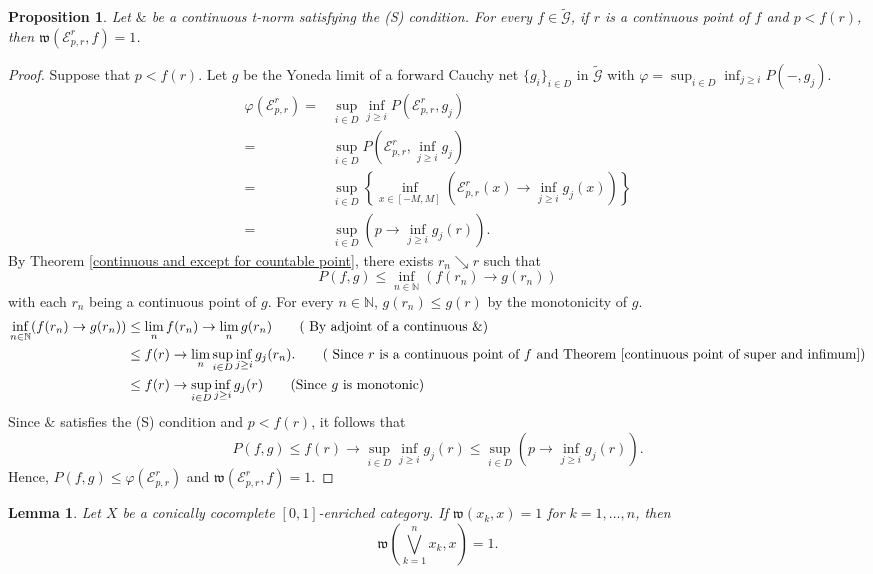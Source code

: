 \documentclass[preprint,3p,times]{elsarticle}
\theoremstyle{plain}
\newtheorem{lem}[thm]{Lemma}
\newtheorem{prop}[thm]{Proposition}
\theoremstyle{definition}
\renewcommand{\phi}{\varphi}
\numberwithin{equation}{section}
\begin{document}
\begin{prop} \label{right branch way below}
	Let \( \& \) be a continuous t-norm satisfying the (S) condition.  For every \(f\in \tilde{\mathcal{G}}\), if \(r\) is a continuous point of \(f\) and \(p < f(r)\), 
	then \( \mathfrak{w}(\mathcal{E}^r_{p,r},f)=1\).  
\end{prop}
\begin{proof}

    Suppose that \(p< f(r) \).
	Let \(g\) be the Yoneda limit of a forward Cauchy net \(\{g_i\}_{i \in D}\) in \(\tilde{\mathcal{G}}\) with \(\phi=\sup_{i\in D} \inf_{j\ge i} P(-,g_j )\).
    \begin{align*}
		\phi (\mathcal{E}^r_{p,r})=& \sup_{i\in D} \inf_{j\ge i} P(\mathcal{E}^r_{p,r},g_j )\\
		=&\sup_{i\in D}P(\mathcal{E}^r_{p,r}, \inf_{j\ge i}g_j )\\
		=&\sup_{i\in D}\left\{\inf_{x\in [-M,M]} (\mathcal{E}^r_{p,r}(x)\rightarrow \inf_{j\ge i}g_j (x))\right\}\\
		=&\sup_{i\in D}( p\rightarrow \inf_{j\ge i}g_j (r)).
	\end{align*}
	By  Theorem \ref{continuous and except for countable point},  there exists \(r_n\searrow r\) such that \[P(f,g)\le \inf_{n\in \mathbb{N}} (f(r_n)\rightarrow g(r_n))\] with each \(r_n \)  being a continuous point of  \(g\).
	For  every \(n\in \mathbb{N}\), \(g(r_n)\le g(r)\) by the monotonicity of \(g\). 
       \begin{align*}
             \inf_{n\in \mathbb{N}} (f(r_n)\rightarrow g(r_n)) &\le
          \lim_n f(r_n) \rightarrow \lim_{n} g(r_n) \tag{ By adjoint of a continuous \(\&\)}\\
          &\le f(r)\rightarrow \lim_{n} \sup_{i\in D} \inf_{j\ge i}g_j (r_n). \tag{ Since \(r\) is a continuous point of \(f\) and Theorem \ref{continuous point of super and infimum}}\\
         &\le f(r)\rightarrow \sup_{i\in D} \inf_{j\ge i}g_j (r) \tag{Since \(g\) is monotonic}
     \end{align*}
		Since \(\&\) satisfies the (S) condition and \(p<f(r)\), it follows that
		\[ P(f,g)\le f(r)\rightarrow \sup_{i\in D} \inf_{j\ge i}g_j (r) \le \sup_{i\in D}( p\rightarrow \inf_{j\ge i}g_j (r)).\]
		Hence, \( P(f,g)\le \phi (\mathcal{E}^r_{p,r})\) and \( \mathfrak{w}(\mathcal{E}^r_{p,r},f)=1\).
\end{proof}
\begin{lem}\label{finite join of enriched way below}
Let \(X\) be a conically cocomplete \([0,1]\)-enriched category.
If \(\mathfrak w(x_k,x)=1\) for \(k=1,\ldots,n\), then
\[
\mathfrak w\left(\bigvee_{k=1}^n x_k,x\right)=1.
\]
\end{lem}
\end{document}
